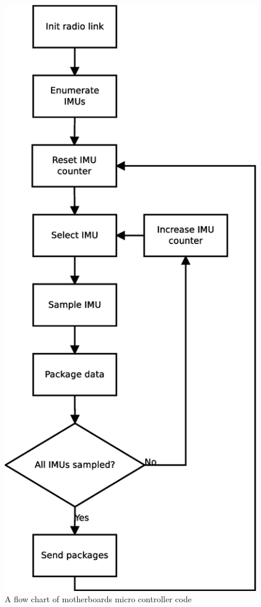 \documentclass[a4paper, 12pt]{article}
\begin{document}
\begin{figure}[h!]
    \centering
    \includegraphics[scale=0.38]{micro.eps}
    \caption{A flow chart of motherboards micro controller code}
    \label{fig:pic3}
\end{figure}
\end{document}
